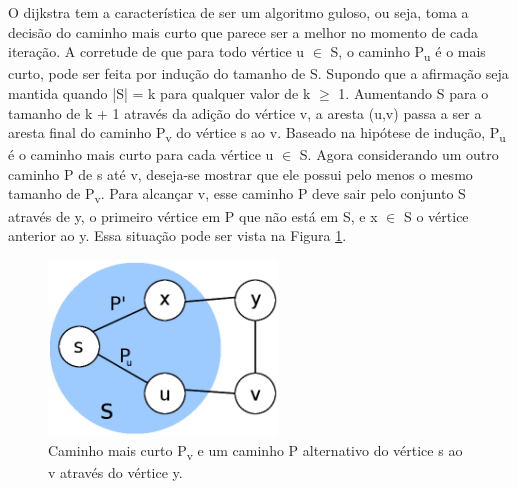 \documentclass[
	12pt,				%
	oneside,			%
	a4paper,			%
	english,			%
	french,				%
	spanish,			%
	brazil,				%
	]{abntex2}
\begin{document}
O dijkstra tem a característica de ser um algoritmo guloso, ou seja, toma a decisão do caminho mais curto que parece ser a melhor no momento de cada iteração. A corretude de que para todo vértice \textsf{u $\in$ S}, o caminho \textsf{P\textsubscript{u}} é o mais curto, pode ser feita por indução do tamanho de \textsf{S}. Supondo que a afirmação seja mantida quando \textsf{|S| = k} para qualquer valor de \textsf{k $\ge$ 1}. Aumentando \textsf{S} para o tamanho de \textsf{k + 1} através da adição do vértice \textsf{v}, a aresta \textsf{(u,v)} passa a ser a aresta final do caminho \textsf{P\textsubscript{v}} do vértice \textsf{s} ao \textsf{v}. Baseado na hipótese de indução, \textsf{P\textsubscript{u}} é o caminho mais curto para cada vértice \textsf{u $\in$ S}. Agora considerando um outro caminho \textsf{P} de \textsf{s} até \textsf{v}, deseja-se mostrar que ele possui pelo menos o mesmo tamanho de \textsf{P\textsubscript{v}}. Para alcançar \textsf{v}, esse caminho \textsf{P} deve sair pelo conjunto \textsf{S} através de \textsf{y}, o primeiro vértice em \textsf{P} que não está em \textsf{S}, e \textsf{x $\in$ S} o vértice anterior ao \textsf{y}. Essa situação pode ser vista na Figura \ref{fig:graph}.

\begin{figure}[!ht]
 \centering
 \includegraphics[width=2.4in]{graph.png}
 \caption{Caminho mais curto \textsf{P\textsubscript{v}} e um caminho \textsf{P} alternativo do vértice \textsf{s} ao \textsf{v} através do vértice \textsf{y}.}
 \label{fig:graph}
\end{figure}
\end{document}
